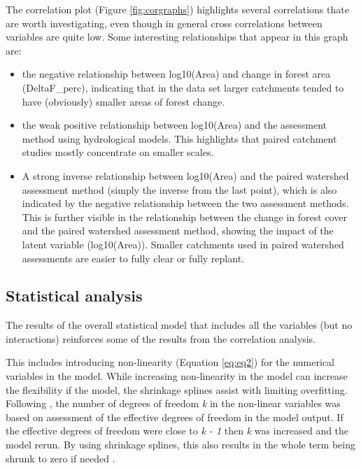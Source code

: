 \documentclass[]{elsarticle} %
\providecommand{\tightlist}{%
  \setlength{\itemsep}{0pt}\setlength{\parskip}{0pt}}
\begin{document}
The correlation plot (Figure \ref{fig:corgraphs}) highlights several correlations thate are worth investigating, even though in general cross correlations between variables are quite low. Some interesting relationships that appear in this graph are:

\begin{itemize}
\tightlist
\item
  the negative relationship between log10(Area) and change in forest area (DeltaF\_perc), indicating that in the data set larger catchments tended to have (obviously) smaller areas of forest change.
\item
  the weak positive relationship between log10(Area) and the assessment method using hydrological models. This highlights that paired catchment studies mostly concentrate on smaller scales.
\item
  A strong inverse relationship between log10(Area) and the paired watershed assessment method (simply the inverse from the last point), which is also indicated by the negative relationship between the two assessment methods. This is further visible in the relationship between the change in forest cover and the paired watershed assessment method, showing the impact of the latent variable (log10(Area)). Smaller catchments used in paired watershed assessments are easier to fully clear or fully replant.
\end{itemize}

\hypertarget{statistical-analysis}{%
\subsection{Statistical analysis}\label{statistical-analysis}}

The results of the overall statistical model that includes all the variables (but no interactions) reinforces some of the results from the correlation analysis.

This includes introducing non-linearity (Equation \eqref{eq:eq2}) for the numerical variables in the model. While increasing non-linearity in the model can increase the flexibility if the model, the shrinkage splines assist with limiting overfitting. Following \citet{wood2006}, the number of degrees of freedom \emph{k} in the non-linear variables was based on assessment of the effective degrees of freedom in the model output. If the effective degrees of freedom were close to \emph{k - 1} then \emph{k} was increased and the model rerun. By using shrinkage splines, this also results in the whole term being shrunk to zero if needed \citep{wood2006}.
\end{document}
